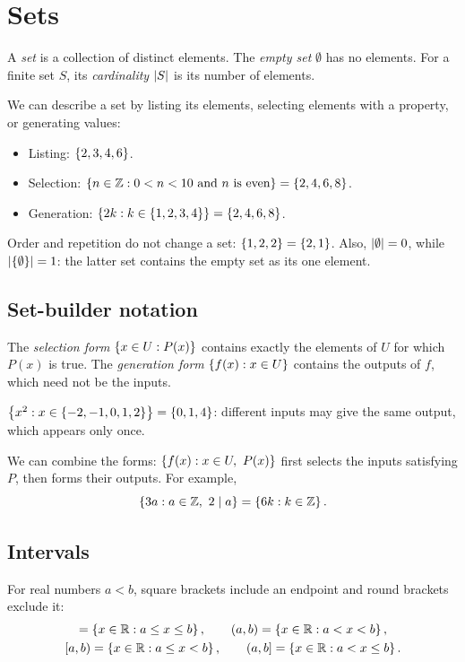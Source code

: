 \section{Sets}

\begin{definition}
A \emph{set} is a collection of distinct elements. The \emph{empty set} $\emptyset$ has no elements. For a finite set $S$, its \emph{cardinality} $\left|S\right|$ is its number of elements.
\end{definition}
We can describe a set by listing its elements, selecting elements with a property, or generating values:
\begin{itemize}
    \item Listing: $\left\{2,3,4,6\right\}$.
    \item Selection: $\left\{n\in\mathbb{Z} : 0<n<10 \text{ and } n \text{ is even}\right\}=\left\{2,4,6,8\right\}$.
    \item Generation: $\left\{2k : k\in\left\{1,2,3,4\right\}\right\}=\left\{2,4,6,8\right\}$.
\end{itemize}
\begin{example}
Order and repetition do not change a set: $\left\{1,2,2\right\}=\left\{2,1\right\}$. Also, $\left|\emptyset\right|=0$, while $\left|\left\{\emptyset\right\}\right|=1$: the latter set contains the empty set as its one element.
\end{example}

\subsection{Set-builder notation}
\begin{definition}
The \emph{selection form} $\left\{x\in U : P(x)\right\}$ contains exactly the elements of $U$ for which $P(x)$ is true. The \emph{generation form} $\left\{f(x) : x\in U\right\}$ contains the outputs of $f$, which need not be the inputs.
\end{definition}
\begin{example}
    $\left\{x^2 : x\in\left\{-2,-1,0,1,2\right\}\right\}=\left\{0,1,4\right\}$: different inputs may give the same output, which appears only once.
\end{example}
We can combine the forms: $\left\{f(x) : x\in U,\ P(x)\right\}$ first selects the inputs satisfying $P$, then forms their outputs. For example,
\[
    \left\{3a : a\in\mathbb{Z},\ 2\mid a\right\}=\left\{6k : k\in\mathbb{Z}\right\}.
\]

\subsection{Intervals}
For real numbers $a<b$, square brackets include an endpoint and round brackets exclude it:
\begin{gather*}
    [a,b]=\set{x\in\R : a\leq x\leq b}, \qquad
    (a,b)=\set{x\in\R : a<x<b},\\
    [a,b)=\set{x\in\R : a\leq x<b}, \qquad
    (a,b]=\set{x\in\R : a<x\leq b}.
\end{gather*}

